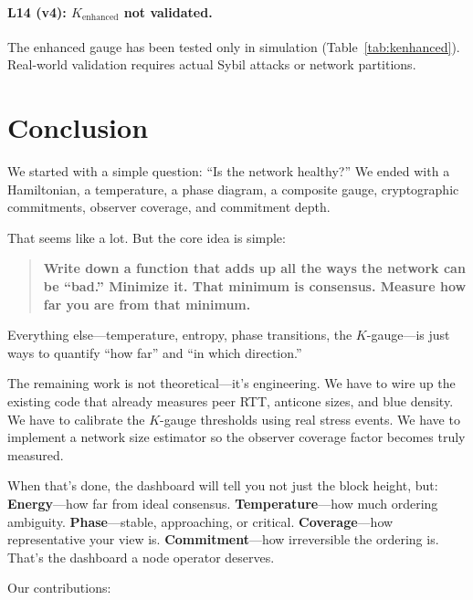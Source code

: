 \documentclass[11pt,a4paper]{article}
\begin{document}
\paragraph{L14 (v4): $K_{\text{enhanced}}$ not validated.} The enhanced gauge has been tested only in simulation (Table~\ref{tab:kenhanced}). Real-world validation requires actual Sybil attacks or network partitions.

\section{Conclusion}

We started with a simple question: ``Is the network healthy?'' We ended with a Hamiltonian, a temperature, a phase diagram, a composite gauge, cryptographic commitments, observer coverage, and commitment depth.

That seems like a lot. But the core idea is simple:

\begin{quote}
\textbf{Write down a function that adds up all the ways the network can be ``bad.'' Minimize it. That minimum is consensus. Measure how far you are from that minimum.}
\end{quote}

Everything else---temperature, entropy, phase transitions, the $K$-gauge---is just ways to quantify ``how far'' and ``in which direction.''

The remaining work is not theoretical---it's engineering. We have to wire up the existing code that already measures peer RTT, anticone sizes, and blue density. We have to calibrate the $K$-gauge thresholds using real stress events. We have to implement a network size estimator so the observer coverage factor becomes truly measured.

When that's done, the dashboard will tell you not just the block height, but: \textbf{Energy}---how far from ideal consensus. \textbf{Temperature}---how much ordering ambiguity. \textbf{Phase}---stable, approaching, or critical. \textbf{Coverage}---how representative your view is. \textbf{Commitment}---how irreversible the ordering is. That's the dashboard a node operator deserves.

Our contributions:
\end{document}
